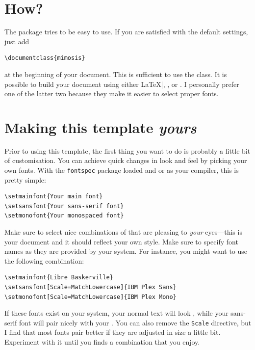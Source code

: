\section{How?}

The package tries to be easy to use. If you are satisfied with the
default settings, just add
%
\begin{verbatim}
\documentclass{mimosis}
\end{verbatim}
%
at the beginning of your document. This is sufficient to use the class.
It is possible to build your document using either \LaTeX|, \XeLaTeX, or
\LuaLaTeX. I personally prefer one of the latter two because they make
it easier to select proper fonts.

\section{Making this template \emph{yours}}

Prior to using this template, the first thing you want to do is probably
a little bit of customisation. You can achieve quick changes in look and
feel by picking your own fonts. With the \verb|fontspec| package loaded
and  \XeLaTeX or \LuaLaTeX as your compiler, this is pretty simple:
%
\begin{verbatim}
\setmainfont{Your main font}
\setsansfont{Your sans-serif font}
\setmonofont{Your monospaced font}
\end{verbatim}
%
Make sure to select nice combinations of that are pleasing to
\emph{your} eyes---this is your document and it should reflect your own
style. Make sure to specify font names as they are provided by your
system. For instance, you might want to use the following combination:
%
\begin{verbatim}
\setmainfont{Libre Baskerville}
\setsansfont[Scale=MatchLowercase]{IBM Plex Sans}
\setmonofont[Scale=MatchLowercase]{IBM Plex Mono}
\end{verbatim}
%
\ifxetexorluatex
If these fonts exist on your system, your normal text will look
{}, while your sans-serif font {will 
pair nicely with your} {}.
%
You can also remove the \verb|Scale| directive, but I find that most
fonts pair better if they are adjusted in size a little bit. Experiment
with it until you finds a combination that you enjoy.
\fi

